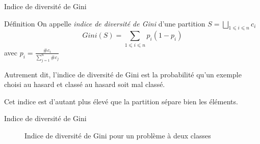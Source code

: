 \documentclass[../allslides.tex]{subfiles}
\begin{document}
\begin{frame}{Indice de diversité de Gini}
    \begin{block}{Définition}
        On appelle \emph{indice de diversité de Gini} d'une partition \(S=⨆_{1⩽i⩽n}c_i\)
        \begin{equation}
            Gini(S) = ∑_{1⩽i⩽n}p_i(1-p_i)
        \end{equation}
        avec \(p_i=\frac{\#c_i}{∑_{j=1}^n\#c_j}\)
    \end{block}
    Autrement dit, l'indice de diversité de Gini est la probabilité qu'un exemple choisi au hasard et classé au hasard soit mal classé.

	Cet indice est d'autant plus élevé que la partition sépare bien les éléments.
\end{frame}

\begin{frame}{Indice de diversité de Gini}
    \begin{figure}
        \tikzset{external/export=true}
        \caption{Indice de diversité de Gini pour un problème à deux classes}
    \end{figure}
\end{frame}
\end{document}
